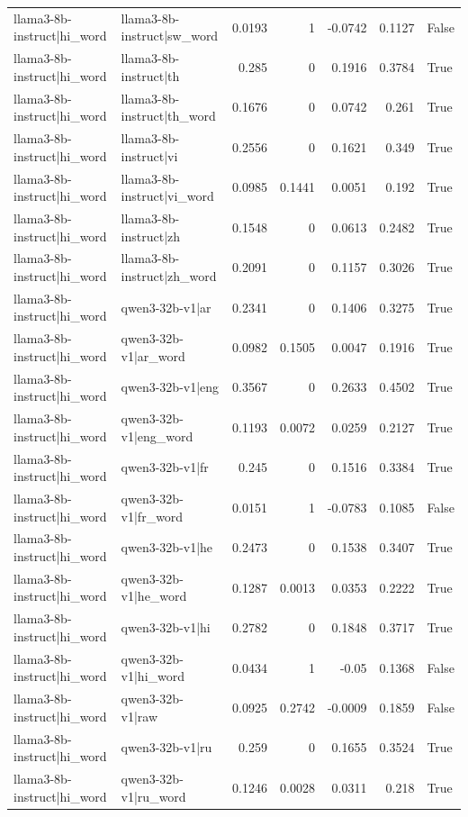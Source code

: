 \begin{table}
\begin{tabular}{l l r r r r l}
llama3-8b-instruct|hi_word & llama3-8b-instruct|sw_word & 0.0193 & 1 & -0.0742 & 0.1127 & False \\
llama3-8b-instruct|hi_word & llama3-8b-instruct|th & 0.285 & 0 & 0.1916 & 0.3784 & True \\
llama3-8b-instruct|hi_word & llama3-8b-instruct|th_word & 0.1676 & 0 & 0.0742 & 0.261 & True \\
llama3-8b-instruct|hi_word & llama3-8b-instruct|vi & 0.2556 & 0 & 0.1621 & 0.349 & True \\
llama3-8b-instruct|hi_word & llama3-8b-instruct|vi_word & 0.0985 & 0.1441 & 0.0051 & 0.192 & True \\
llama3-8b-instruct|hi_word & llama3-8b-instruct|zh & 0.1548 & 0 & 0.0613 & 0.2482 & True \\
llama3-8b-instruct|hi_word & llama3-8b-instruct|zh_word & 0.2091 & 0 & 0.1157 & 0.3026 & True \\
llama3-8b-instruct|hi_word & qwen3-32b-v1|ar & 0.2341 & 0 & 0.1406 & 0.3275 & True \\
llama3-8b-instruct|hi_word & qwen3-32b-v1|ar_word & 0.0982 & 0.1505 & 0.0047 & 0.1916 & True \\
llama3-8b-instruct|hi_word & qwen3-32b-v1|eng & 0.3567 & 0 & 0.2633 & 0.4502 & True \\
llama3-8b-instruct|hi_word & qwen3-32b-v1|eng_word & 0.1193 & 0.0072 & 0.0259 & 0.2127 & True \\
llama3-8b-instruct|hi_word & qwen3-32b-v1|fr & 0.245 & 0 & 0.1516 & 0.3384 & True \\
llama3-8b-instruct|hi_word & qwen3-32b-v1|fr_word & 0.0151 & 1 & -0.0783 & 0.1085 & False \\
llama3-8b-instruct|hi_word & qwen3-32b-v1|he & 0.2473 & 0 & 0.1538 & 0.3407 & True \\
llama3-8b-instruct|hi_word & qwen3-32b-v1|he_word & 0.1287 & 0.0013 & 0.0353 & 0.2222 & True \\
llama3-8b-instruct|hi_word & qwen3-32b-v1|hi & 0.2782 & 0 & 0.1848 & 0.3717 & True \\
llama3-8b-instruct|hi_word & qwen3-32b-v1|hi_word & 0.0434 & 1 & -0.05 & 0.1368 & False \\
llama3-8b-instruct|hi_word & qwen3-32b-v1|raw & 0.0925 & 0.2742 & -0.0009 & 0.1859 & False \\
llama3-8b-instruct|hi_word & qwen3-32b-v1|ru & 0.259 & 0 & 0.1655 & 0.3524 & True \\
llama3-8b-instruct|hi_word & qwen3-32b-v1|ru_word & 0.1246 & 0.0028 & 0.0311 & 0.218 & True \\

\end{tabular}
\end{table}
